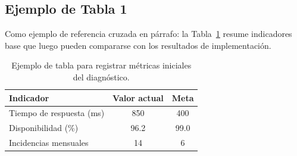 \subsection{Ejemplo de Tabla 1}
Como ejemplo de referencia cruzada en párrafo: la Tabla~\ref{tab:ejemplo_1} resume indicadores base que luego pueden compararse con los resultados de implementación.

\begin{table}[htbp]
  \centering
  \caption{Ejemplo de tabla para registrar métricas iniciales del diagnóstico.}
  \label{tab:ejemplo_1}
  \begin{tabular}{|l|c|c|}
    \hline
    Indicador & Valor actual & Meta \\
    \hline
    Tiempo de respuesta (ms) & 850 & 400 \\
    \hline
    Disponibilidad (\%) & 96.2 & 99.0 \\
    \hline
    Incidencias mensuales & 14 & 6 \\
    \hline
  \end{tabular}
\end{table}
